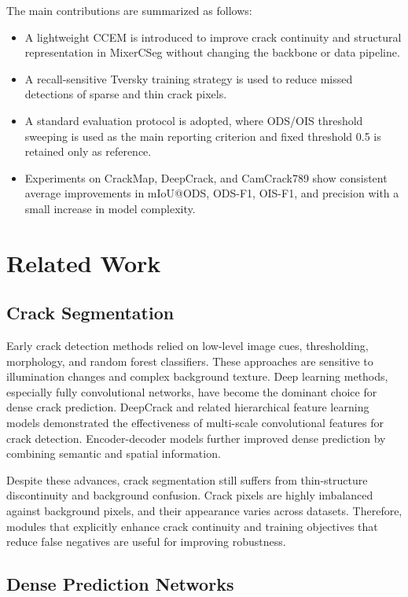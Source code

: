 \documentclass[preprint,12pt]{elsarticle}
\begin{document}
The main contributions are summarized as follows:
\begin{itemize}
    \item A lightweight CCEM is introduced to improve crack continuity and structural representation in MixerCSeg without changing the backbone or data pipeline.
    \item A recall-sensitive Tversky training strategy is used to reduce missed detections of sparse and thin crack pixels.
    \item A standard evaluation protocol is adopted, where ODS/OIS threshold sweeping is used as the main reporting criterion and fixed threshold 0.5 is retained only as reference.
    \item Experiments on CrackMap, DeepCrack, and CamCrack789 show consistent average improvements in mIoU@ODS, ODS-F1, OIS-F1, and precision with a small increase in model complexity.
\end{itemize}

\section{Related Work}
\label{sec:related}

\subsection{Crack Segmentation}

Early crack detection methods relied on low-level image cues, thresholding, morphology, and random forest classifiers. These approaches are sensitive to illumination changes and complex background texture. Deep learning methods, especially fully convolutional networks, have become the dominant choice for dense crack prediction. DeepCrack and related hierarchical feature learning models demonstrated the effectiveness of multi-scale convolutional features for crack detection. Encoder-decoder models further improved dense prediction by combining semantic and spatial information.

Despite these advances, crack segmentation still suffers from thin-structure discontinuity and background confusion. Crack pixels are highly imbalanced against background pixels, and their appearance varies across datasets. Therefore, modules that explicitly enhance crack continuity and training objectives that reduce false negatives are useful for improving robustness.

\subsection{Dense Prediction Networks}
\end{document}
